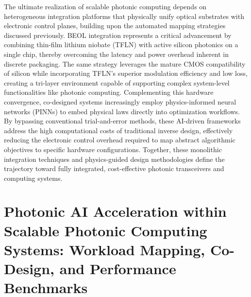 \documentclass[11pt]{article}
\begin{document}
The ultimate realization of scalable photonic computing depends on heterogeneous integration platforms that physically unify optical substrates with electronic control planes, building upon the automated mapping strategies discussed previously. BEOL integration represents a critical advancement by combining thin-film lithium niobate (TFLN) with active silicon photonics on a single chip, thereby overcoming the latency and power overhead inherent in discrete packaging. The same strategy leverages the mature CMOS compatibility of silicon while incorporating TFLN's superior modulation efficiency and low loss, creating a tri-layer environment capable of supporting complex system-level functionalities like photonic computing. Complementing this hardware convergence, co-designed systems increasingly employ physics-informed neural networks (PINNs) to embed physical laws directly into optimization workflows. By bypassing conventional trial-and-error methods, these AI-driven frameworks address the high computational costs of traditional inverse design, effectively reducing the electronic control overhead required to map abstract algorithmic objectives to specific hardware configurations. Together, these monolithic integration techniques and physics-guided design methodologies define the trajectory toward fully integrated, cost-effective photonic transceivers and computing systems. \citep{s2_9b444e84d20ae6e3d62d2d4df30268b5a53baad2_40af2cc9} \citep{s2_037e66f37189104d61c0d000de0cee202b7eec9e_d15b8018}

\section{Photonic AI Acceleration within Scalable Photonic Computing Systems: Workload Mapping, Co-Design, and Performance Benchmarks}\label{photonic-ai-acceleration-within-scalable-photonic-computing-systems-workload-mapping-co-design-and-performance-benchmarks}
\end{document}
